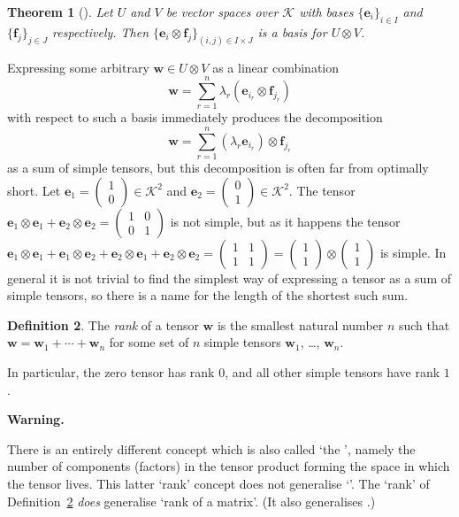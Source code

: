 \documentclass[12pt]{article}
\newtheorem{theorem}{Theorem}
\theoremstyle{definition}
\newtheorem{definition}[theorem]{Definition}
\newenvironment{warning}{%
  \trivlist\item\relax
  \textbf{Warning.}\hspace*{0.5em}\ignorespaces
}{\endtrivlist}
\newcommand{\vek}[1]{\mathbf{#1}}
\newcommand{\K}{\mathcal{K}}
\newcommand*{\spmatrix}[1]{%
  \left(\begin{smallmatrix}#1\end{smallmatrix}\right)%
}
\begin{document}
\begin{theorem}[]
  Let $U$ and $V$ be vector spaces over $\K$ with bases 
  $\{\vek{e}_i\}_{i \in I}$ and $\{\vek{f}_j\}_{j \in J}$ 
  respectively. Then \( \{ \vek{e}_i \otimes \vek{f}_j\}_{(i,j) \in 
  I \times J} \) is a basis for $U \otimes V$.
\end{theorem}

Expressing some arbitrary \(\vek{w} \in U \otimes V\) as a linear 
combination
$$
  \vek{w} = \sum_{r=1}^n \lambda_r(\vek{e}_{i_r} \otimes \vek{f}_{j_r})
$$
with respect to such a basis immediately produces the decomposition
$$
  \vek{w} = \sum_{r=1}^n (\lambda_r\vek{e}_{i_r}) \otimes \vek{f}_{j_r}
$$
as a sum of simple tensors, but this decomposition is often far 
from optimally short. 
Let \(\vek{e}_1 = \spmatrix{1\\0} \in \K^2\) and \(\vek{e}_2 = 
\spmatrix{0\\1} \in \K^2\). The tensor \(\vek{e}_1 \otimes \vek{e}_1 
+ \vek{e}_2 \otimes \vek{e}_2 = \spmatrix{1 & 0 \\ 0 & 1}\) is not 
simple, but as it happens the tensor \(\vek{e}_1 \otimes \vek{e}_1 + 
\vek{e}_1 \otimes \vek{e}_2 + \vek{e}_2 \otimes \vek{e}_1 + 
\vek{e}_2 \otimes \vek{e}_2 = \spmatrix{1&1\\1&1} = 
\spmatrix{1\\1} \otimes \spmatrix{1\\1}\) is simple. In general it 
is not trivial to find the simplest way of expressing a tensor as 
a sum of simple tensors, so there is a name for the length of the 
shortest such sum.


\begin{definition} \label{Def:Rang}
  The \emph{rank} of a tensor $\vek{w}$ is the smallest natural 
  number $n$ such that \(\vek{w} = \vek{w}_1 + \dotsb + \vek{w}_n\) 
  for some set of $n$ simple tensors $\vek{w}_1$, \dots, $\vek{w}_n$.
\end{definition}

In particular, the zero tensor has rank $0$, and all other simple 
tensors have rank $1$.

\begin{warning}
  There is an entirely different concept which is also called 
  `the ', 
  namely the number of components (factors) in the tensor 
  product forming the space in which the tensor lives. This latter 
  `rank' concept does not generalise 
  `'. 
  The `rank' of Definition~\ref{Def:Rang} \emph{does} 
  generalise `rank of a matrix'. (It also generalises 
  .)
\end{warning}
\end{document}

